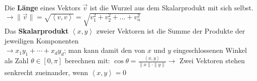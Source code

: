 Die \textbf{Länge} eines Vektors \(\vec{v}\) ist die Wurzel aus dem Skalarprodukt mit sich selbst.\\
\(\rightarrow \|\vec{v}\| = \sqrt{\left\langle v, v\right\rangle} = \sqrt{v_1^2 + v_2^2 + \dots + v_n^2}\)\\

Das \textbf{Skalarprodukt} \(\left\langle x, y\right\rangle \) zweier Vektoren ist die Summe der Produkte der jeweiligen Komponenten\\
\(\rightarrow x_1y_1+\cdots + x_dy_d\); man kann damit den von \(x\) und \(y\) eingeschlossenen Winkel als Zahl \(\theta \in [0,\pi]\) berechnen mit: \(\cos \theta = \frac{\left\langle x, y\right\rangle}{\|x\|\cdot \|y\|} \rightarrow\) Zwei Vektoren stehen senkrecht zueinander, wenn \(\left\langle x, y\right\rangle = 0\)\\